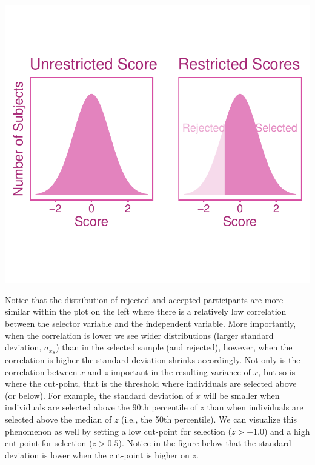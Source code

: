 \documentclass[
  letterpaper,
  DIV=11,
  numbers=noendperiod]{scrreprt}
\begin{document}
\includegraphics{indirect_range_restriction_files/figure-pdf/unnamed-chunk-1-1.pdf}

Notice that the distribution of rejected and accepted participants are
more similar within the plot on the left where there is a relatively low
correlation between the selector variable and the independent variable.
More importantly, when the correlation is lower we see wider
distributions (larger standard deviation, \(\sigma_{x_S}\)) than in the
selected sample (and rejected), however, when the correlation is higher
the standard deviation shrinks accordingly. Not only is the correlation
between \(x\) and \(z\) important in the resulting variance of \(x\),
but so is where the cut-point, that is the threshold where individuals
are selected above (or below). For example, the standard deviation of
\(x\) will be smaller when individuals are selected above the 90th
percentile of \(z\) than when individuals are selected above the median
of \(z\) (i.e., the 50th percentile). We can visualize this phenomenon
as well by setting a low cut-point for selection (\(z>-1.0\)) and a high
cut-point for selection (\(z>0.5\)). Notice in the figure below that the
standard deviation is lower when the cut-point is higher on \(z\).
\end{document}

